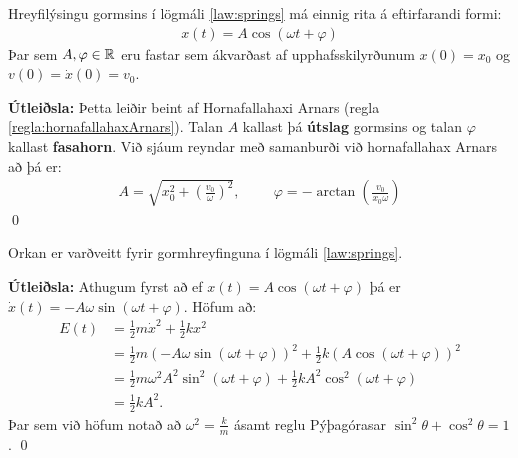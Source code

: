 \ifdefined \wholebook \else\documentclass[oneside]{book}\usepackage{EdlBook}\graphicspath{{figures/}}
\begin{document}
\begin{tcolorbox}
\begin{theorem}
Hreyfilýsingu gormsins í lögmáli \ref{law:springs} má einnig rita á eftirfarandi formi:
\begin{align*}
    x(t) = A\cos(\omega t + \varphi)
\end{align*}
Þar sem $A, \varphi \in \mathbb{R}$ eru fastar sem ákvarðast af upphafsskilyrðunum $x(0) = x_0$ og $v(0) = \dot{x}(0) = v_0$.
\end{theorem}
\end{tcolorbox}

\textbf{Útleiðsla:} Þetta leiðir beint af Hornafallahaxi Arnars (regla \ref{regla:hornafallahaxArnars}). Talan $A$ kallast þá \textbf{útslag} gormsins og talan $\varphi$ kallast \textbf{fasahorn}. Við sjáum reyndar með samanburði við hornafallahax Arnars að þá er:
\begin{align*}
    A = \sqrt{x_0^2 + \left(\frac{v_0}{\omega}\right)^2}, \hspace{1cm} \varphi = -\arctan(\frac{v_0}{x_0\omega})
\end{align*}
\qed

\vspace{0.2cm}

\begin{tcolorbox}
\begin{theorem}
Orkan er varðveitt fyrir gormhreyfinguna í lögmáli \ref{law:springs}.
\end{theorem}
\end{tcolorbox}
\textbf{Útleiðsla:} Athugum fyrst að ef $x(t) = A\cos(\omega t + \varphi)$ þá er $\dot{x}(t) = -A\omega \sin(\omega t + \varphi)$. Höfum að:
\begin{align*}
    E(t) &= \frac{1}{2}m\dot{x}^2 + \frac{1}{2}kx^2 \\
    &= \frac{1}{2}m \left( -A\omega \sin(\omega t + \varphi)\right)^2  + \frac{1}{2}k\left(A \cos(\omega t + \varphi) \right)^2 \\
    &= \frac{1}{2}m \omega^2 A^2 \sin^2(\omega t + \varphi) + \frac{1}{2}k A^2\cos^2(\omega t + \varphi) \\
    &= \frac{1}{2}kA^2.
\end{align*}
Þar sem við höfum notað að $\omega^2 = \frac{k}{m}$ ásamt reglu Pýþagórasar $\sin^2\theta + \cos^2\theta = 1$.
\qed
\end{document}
